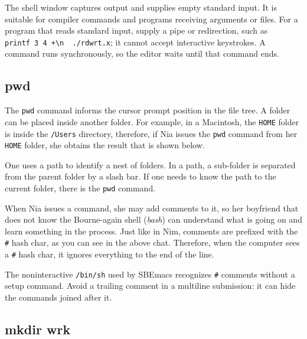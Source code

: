 \documentclass[
  12pt,
]{book}
\newenvironment{Shaded}{}{}
\newcommand{\NormalTok}[1]{#1}
\begin{document}
The shell window captures output and supplies empty standard input. It
is suitable for compiler commands and programs receiving arguments or
files. For a program that reads standard input, supply a pipe or
redirection, such as
\texttt{printf\ \textquotesingle{}3\ 4\ +\textbackslash{}n\textquotesingle{}\ \textbar{}\ ./rdwrt.x};
it cannot accept interactive keystrokes. A command runs synchronously,
so the editor waits until that command ends.

\subsection*{pwd}\label{pwd}

The \texttt{pwd} command informs the cursor prompt position in the file
tree. A folder can be placed inside another folder. For example, in a
Macintosh, the \texttt{HOME} folder is inside the \texttt{/Users}
directory, therefore, if Nia issues the \texttt{pwd} command from her
\texttt{HOME} folder, she obtains the result that is shown below.

\begin{Shaded}
\end{Shaded}

One uses a path to identify a nest of folders. In a path, a sub-folder
is separated from the parent folder by a slash bar. If one needs to know
the path to the current folder, there is the \texttt{pwd} command.

When Nia issues a command, she may add comments to it, so her boyfriend
that does not know the Bourne-again shell (\emph{bash}) can understand
what is going on and learn something in the process. Just like in Nim,
comments are prefixed with the \texttt{\#} hash char, as you can see in
the above chat. Therefore, when the computer sees a \texttt{\#} hash
char, it ignores everything to the end of the line.

The noninteractive \texttt{/bin/sh} used by SBEmacs recognizes
\texttt{\#} comments without a setup command. Avoid a trailing comment
in a multiline submission: it can hide the commands joined after it.

\subsection*{mkdir wrk}\label{mkdir}
\end{document}
